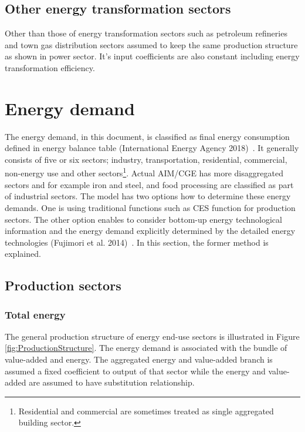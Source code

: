 \documentclass[10pt,a4paper,titlepage,dvipdfmx]{book}
\begin{document}
\begin{itemize}
\subsection{\label{subsec:OthEneTraSec}{Other energy transformation sectors}}

Other than those of energy transformation sectors such as petroleum refineries and town gas distribution sectors assumed to keep the same production structure as shown in power sector. It's input coefficients are also constant including energy transformation efficiency.

\section{\label{sec:EneDem}{Energy demand}}

The energy demand, in this document, is classified as final energy consumption defined in energy balance table (International Energy Agency 2018)~\cite{RN3606}. It generally consists of five or six sectors; industry, transportation, residential, commercial, non-energy use and other sectors\footnote{Residential and commercial are sometimes treated as single aggregated building sector.}. Actual AIM/CGE has more disaggregated sectors and for example iron and steel, and food processing are classified as part of industrial sectors. The model has two options how to determine these energy demands. One is using traditional functions such as CES function for production sectors. The other option enables to consider bottom-up energy technological information and the energy demand explicitly determined by the detailed energy technologies (Fujimori et al. 2014)~\cite{RN4010}. In this section, the former method is explained.

\subsection{\label{subsec:ProSec}{Production sectors}}

\subsubsection{\label{subsubsec:TotEne}Total energy}

The general production structure of energy end-use sectors is illustrated in Figure \ref{fig:ProductionStructure}. The energy demand is associated with the bundle of value-added and energy. The aggregated energy and value-added branch is assumed a fixed coefficient to output of that sector while the energy and value-added are assumed to have substitution relationship.


\end{itemize}
\end{document}
